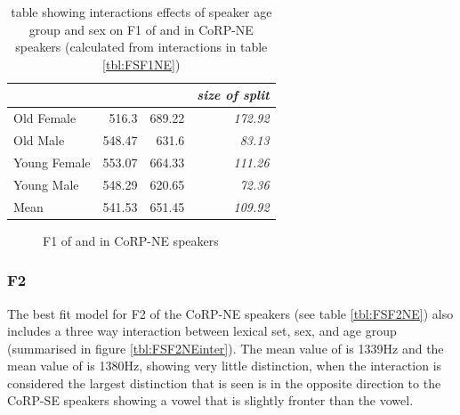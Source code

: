 \documentclass[../../../00.FullDoc/tex/ThesisSkeleton-draft2]{subfiles}
\begin{document}


\begin{table}[htbp]
	\centering
	\begin{tabular}{lrrr}
		\hline
		& \multicolumn{1}{l}{\foot{}} & \multicolumn{1}{l}{\strutt{}} & \multicolumn{1}{l}{\textit{size of split}} \\
		\hline
		Old Female & 516.3 & 689.22 & \textit{172.92} \\
		Old Male & 548.47 & 631.6 & \textit{83.13} \\
		Young Female & 553.07 & 664.33 & \textit{111.26} \\
		Young Male & 548.29 & 620.65 & \textit{72.36} \\
		Mean  & 541.53 & 651.45 & \textit{109.92} \\
		\hline
	\end{tabular}%
	\caption{table showing interactions effects of speaker age group and sex on F1 of \foot{} and \strutt{} in CoRP-NE speakers (calculated from interactions in table \ref{tbl:FSF1NE})}
	\label{tbl:FSF1NEinter}%
\end{table}%

\begin{figure}[h]
	
	\caption{F1 of \foot{} and \strutt{} in CoRP-NE speakers} \label{fig:FSF1NE}
\end{figure}


\subsubsection{F2} \label{subsubsec:NEF2}
The best fit model for F2 of the CoRP-NE speakers (see table \ref{tbl:FSF2NE}) also includes a three way interaction between lexical set, sex, and age group (summarised in figure \ref{tbl:FSF2NEinter}). The mean value of \foot{} is 1339Hz and the mean value of \strutt{} is 1380Hz, showing very little distinction, when the interaction is considered the largest distinction that is seen is in the opposite direction to the CoRP-SE speakers showing a \strutt{} vowel that is slightly fronter than the \foot{} vowel.


\end{document}
